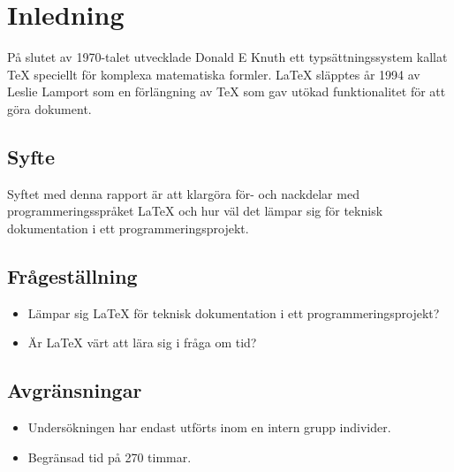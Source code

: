 \section{Inledning}
På slutet av 1970-talet utvecklade Donald E Knuth ett typsättningssystem kallat {\TeX} speciellt för komplexa matematiska formler. {\LaTeX} släpptes år 1994 av Leslie Lamport som en förlängning av {\TeX} som gav utökad funktionalitet för att göra dokument. \citep{latexandfriends}  

\subsection{Syfte}
Syftet med denna rapport är att klargöra för- och nackdelar med programmeringsspråket {\LaTeX} och hur väl det lämpar sig för teknisk dokumentation i ett programmeringsprojekt. 

\subsection{Frågeställning}
\begin{itemize}
\item Lämpar sig {\LaTeX} för teknisk dokumentation i ett programmeringsprojekt? 
\item Är {\LaTeX} värt att lära sig i fråga om tid?
\end{itemize}
		
\subsection{Avgränsningar}
\begin{itemize}
	\item Undersökningen har endast utförts inom en intern grupp individer.
	\item Begränsad tid på 270 timmar. 
\end{itemize}

	